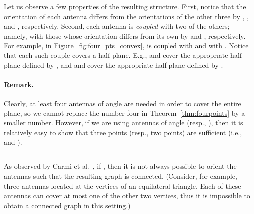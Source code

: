\documentclass[11pt,letter]{article}
\begin{document}
Let us observe a few properties of the resulting structure.
First, notice that the orientation of each antenna differs from the orientations of the other three by , , and , respectively.
Second, each antenna is {\em coupled} with two of the others; namely, with those whose orientation differs from its own by  and , respectively. For example, in Figure~\ref{fig:four_pts_convex},  is coupled with  and with .
Notice that each such couple covers a half plane. E.g.,  and  cover the appropriate half plane defined by , and  and  cover the appropriate half plane defined by .


\paragraph{Remark.}
Clearly, at least four antennas of angle  are needed in order to cover the entire plane, so we cannot replace the number four in Theorem~\ref{thm:fourpoints} by a smaller number. However, if we are using antennas of angle  (resp., ), then it is relatively easy to show that three points (resp., two points) are sufficient (i.e.,  and ).


\subsection{}
As observed by Carmi et al.~\cite{CKLR09}, if ,
then it is not always possible to orient the antennas such that the resulting graph is connected.
(Consider, for example, three antennas located at the vertices of an equilateral triangle.
Each of these antennas can cover at most one of the other two vertices, thus it is impossible to obtain a connected graph in this setting.)
\end{document}
